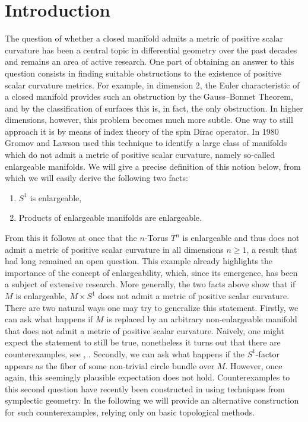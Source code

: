 \section{Introduction}

The question of whether a closed manifold admits a metric of positive scalar curvature has been a central topic in differential geometry over the past decades and remains an area of active research. One part of obtaining an answer to this question consists in finding suitable obstructions to the existence of positive scalar curvature metrics. For example, in dimension 2, the Euler characteristic of a closed manifold provides such an obstruction by the Gauss--Bonnet Theorem, and by the classification of surfaces this is, in fact, the only obstruction. In higher dimensions, however, this problem becomes much more subtle. One way to still approach it is by means of index theory of the spin Dirac operator. In 1980 Gromov and Lawson \cite{gromov1980spin} used this technique to identify a large class of manifolds which do not admit a metric of positive scalar curvature, namely so-called enlargeable manifolds. We will give a precise definition of this notion below, from which we will easily derive the following two facts:

\begin{enumerate}[label=\arabic*.]
    \item $S^1$ is enlargeable,
    \item Products of enlargeable manifolds are enlargeable.
\end{enumerate}

From this it follows at once that the $n$-Torus $T^n$ is enlargeable and thus does not admit a metric of positive scalar curvature in all dimensions $n \geq 1$, a result that had long remained an open question. This example already highlights the importance of the concept of enlargeability, which, since its emergence, has been a subject of extensive research. More generally, the two facts above show that if $M$ is enlargeable, $M \times S^1$ does not admit a metric of positive scalar curvature. There are two natural ways one may try to generalize this statement. Firstly, we can ask what happens if $M$ is replaced by an arbitrary non-enlargeable manifold that does not admit a metric of positive scalar curvature. Naively, one might expect the statement to still be true, nonetheless it turns out that there are counterexamples, see \cite[Remark 1.4]{cecchini2023nonnegative}, \cite[Counterexample 4.16]{stolz2014metrics}. Secondly, we can ask what happens if the $S^1$-factor appears as the fiber of some non-trivial circle bundle over $M$. However, once again, this seemingly plausible expectation does not hold. Counterexamples to this second question have recently been constructed in \cite{kumar2025circle} using techniques from symplectic geometry. In the following we will provide an alternative construction for such counterexamples, relying only on basic topological methods. 


